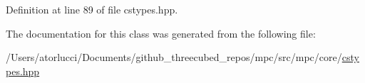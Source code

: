 Definition at line 89 of file cstypes.\+hpp.



The documentation for this class was generated from the following file\+:\begin{DoxyCompactItemize}
\item 
/\+Users/atorlucci/\+Documents/github\+\_\+threecubed\+\_\+repos/mpc/src/mpc/core/\mbox{\hyperlink{cstypes_8hpp}{cstypes.\+hpp}}\end{DoxyCompactItemize}
